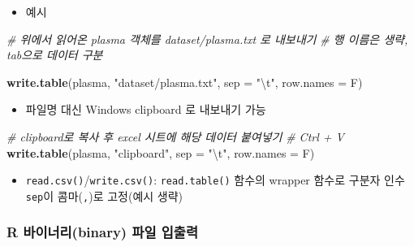 \documentclass[
  11pt,
]{krantz}
\newenvironment{Shaded}{\begin{snugshade}}{\end{snugshade}}
\newcommand{\CharTok}[1]{\textcolor[rgb]{0.5,0.5,0.5}{#1}}
\newcommand{\CommentTok}[1]{\textcolor[rgb]{0.37,0.37,0.37}{\textit{#1}}}
\newcommand{\DataTypeTok}[1]{\textcolor[rgb]{0.27,0.27,0.27}{#1}}
\newcommand{\KeywordTok}[1]{\textcolor[rgb]{0.27,0.27,0.27}{\textbf{#1}}}
\newcommand{\NormalTok}[1]{#1}
\newcommand{\StringTok}[1]{\textcolor[rgb]{0.5,0.5,0.5}{#1}}
\providecommand{\tightlist}{%
  \setlength{\itemsep}{0pt}\setlength{\parskip}{0pt}}
\begin{document}
\normalsize

\begin{itemize}
\tightlist
\item
  예시
\end{itemize}

\footnotesize

\begin{Shaded}
\begin{Highlighting}[]
\CommentTok{# 위에서 읽어온 plasma 객체를 dataset/plasma.txt 로 내보내기}
\CommentTok{# 행 이름은 생략, tab으로 데이터 구분}

\KeywordTok{write.table}\NormalTok{(plasma, }\StringTok{"dataset/plasma.txt"}\NormalTok{, }
            \DataTypeTok{sep =} \StringTok{"}\CharTok{\textbackslash{}t}\StringTok{"}\NormalTok{, }\DataTypeTok{row.names =}\NormalTok{ F)}
\end{Highlighting}
\end{Shaded}

\normalsize

\begin{itemize}
\tightlist
\item
  파일명 대신 Windows clipboard 로 내보내기 가능
\end{itemize}

\footnotesize

\begin{Shaded}
\begin{Highlighting}[]
\CommentTok{# clipboard로 복사 후 excel 시트에 해당 데이터 붙여넣기}
\CommentTok{# Ctrl + V}
\KeywordTok{write.table}\NormalTok{(plasma, }\StringTok{"clipboard"}\NormalTok{, }
            \DataTypeTok{sep =} \StringTok{"}\CharTok{\textbackslash{}t}\StringTok{"}\NormalTok{, }\DataTypeTok{row.names =}\NormalTok{ F)}
\end{Highlighting}
\end{Shaded}

\normalsize

\begin{itemize}
\tightlist
\item
  \texttt{read.csv()}/\texttt{write.csv()}: \texttt{read.table()} 함수의 wrapper 함수로 구분자 인수 \texttt{sep}이 콤마(\texttt{,})로 고정(예시 생략)
\end{itemize}

\hypertarget{binary-import-export}{%
\subsubsection*{R 바이너리(binary) 파일 입출력}\label{binary-import-export}}
\end{document}

